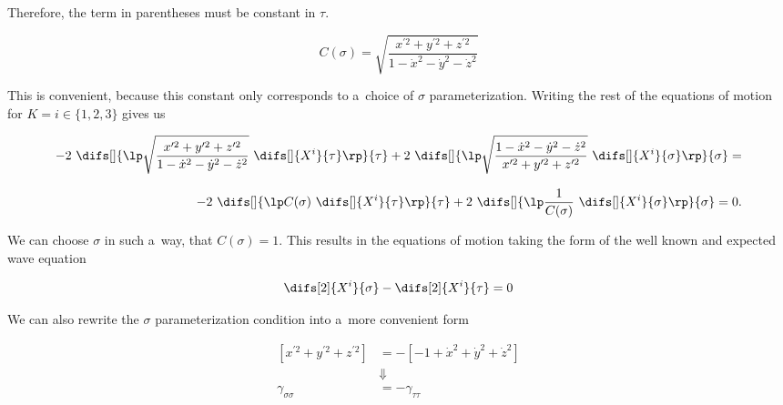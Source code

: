 \noindent
Therefore, the term in parentheses must be constant in $\tau$.

\begin{equation}
\label{eq:EOM_flat_0}
    C(\sigma) =  \sqrt{ \frac{ x^{\prime 2} + y^{\prime 2} + z^{\prime 2} }{1 - \dot{x}^2 - \dot{y}^2 - \dot{z}^2}}
\end{equation}

\noindent
This is convenient, because this constant only corresponds to a~choice of $\sigma$ parameterization. Writing the rest of the equations of motion for $K = i \in \{1, 2, 3\}$ gives us

\begin{equation}
\label{eq:EOM_flat_i}
    \begin{aligned}
    - 2 ~ \difs[] {\lp \sqrt{ \frac{ x^{\prime 2} + y^{\prime 2} + z^{\prime 2}}{1 - \dot{x}^2 - \dot{y}^2 - \dot{z}^2}} ~ \difs[] {X^i} {\tau} \rp}  {\tau} 
    + 2 ~ \difs[] {\lp \sqrt{ \frac{1 - \dot{x}^2 - \dot{y}^2 - \dot{z}^2}{ x^{\prime 2} + y^{\prime 2} + z^{\prime 2} }} ~ \difs[] {X^i} {\sigma} \rp}  {\sigma} = \\[8pt]
    - 2 ~ \difs[] {\lp C(\sigma) ~ \difs[] {X^i} {\tau} \rp}  {\tau} 
    + 2 ~ \difs[] {\lp \frac{1}{C(\sigma)} ~ \difs[] {X^i} {\sigma} \rp}  {\sigma} = 0.
    \end{aligned}
\end{equation}

\noindent
We can choose $\sigma$ in such a~way, that $C(\sigma) = 1$. This results in the equations of motion taking the form of the well known and expected wave equation

\begin{equation}
    \difs[2] {X^i} {\sigma} - \difs[2] {X^i} {\tau} = 0
\end{equation}

\noindent
We can also rewrite the $\sigma$ parameterization condition into a~more convenient form

\begin{equation}
\label{eq:flat_gamma_constraint}
    \begin{aligned}
        \left[ x^{\prime 2} + y^{\prime 2} + z^{\prime 2} \right] &= - \left[- 1 + \dot{x}^2 + \dot{y}^2 + \dot{z}^2 \right] \\
        & \Downarrow \\
        \gamma_{\sigma \sigma} &= - \gamma_{\tau \tau}
    \end{aligned}
\end{equation}

